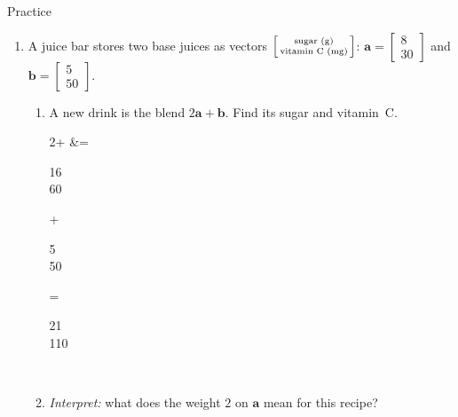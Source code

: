 \documentclass[10pt]{article}
\begin{document}
\begin{notesbox}{Practice}
\begin{enumerate}[leftmargin=1.9em, itemsep=10pt]
\begin{enumerate}[label=(\alph*), leftmargin=1.8em, itemsep=4pt]
      \item $\begin{bsmallmatrix} 2 \\ 1 \end{bsmallmatrix},\ \begin{bsmallmatrix} 1 \\ 3 \end{bsmallmatrix}$ \hfill
      \item $\begin{bsmallmatrix} 4 \\ -2 \end{bsmallmatrix},\ \begin{bsmallmatrix} -2 \\ 1 \end{bsmallmatrix}$
    \end{enumerate}
  \item A juice bar stores two base juices as vectors
        $\begin{bsmallmatrix} \text{sugar (g)} \\ \text{vitamin C (mg)} \end{bsmallmatrix}$:
        $\mathbf{a}=\begin{bmatrix} 8 \\ 30 \end{bmatrix}$ and
        $\mathbf{b}=\begin{bmatrix} 5 \\ 50 \end{bmatrix}$.
    \begin{enumerate}[label=(\alph*), leftmargin=1.8em, itemsep=5pt]
      \item A new drink is the blend $2\mathbf{a}+\mathbf{b}$. Find its sugar and vitamin~C.
\begin{work}
  2+ &= \begin{bsmallmatrix} 16 \\ 60 \end{bsmallmatrix}
                            + \begin{bsmallmatrix} 5 \\ 50 \end{bsmallmatrix}
                          = \begin{bsmallmatrix} 21 \\ 110 \end{bsmallmatrix}
                          \ \ 
\end{work}
      \item \emph{Interpret:} what does the weight $2$ on $\mathbf{a}$ mean for this recipe? \writeline
    \end{enumerate}
\end{enumerate}
\end{notesbox}
\end{document}

